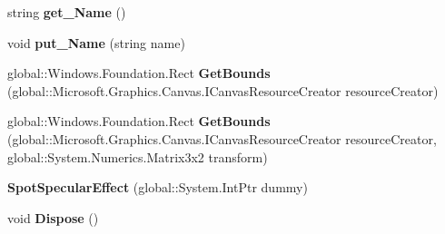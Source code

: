 \begin{DoxyCompactItemize}
\item 
\mbox{\label{class_microsoft_1_1_graphics_1_1_canvas_1_1_effects_1_1_spot_specular_effect_a4cee2d3b8d6c8d7c3806d7c618423b1b}} 
string {\bfseries get\+\_\+\+Name} ()
\item 
\mbox{\label{class_microsoft_1_1_graphics_1_1_canvas_1_1_effects_1_1_spot_specular_effect_acfbb75a4f9d89ea84e89f4b37ae058f6}} 
void {\bfseries put\+\_\+\+Name} (string name)
\item 
\mbox{\label{class_microsoft_1_1_graphics_1_1_canvas_1_1_effects_1_1_spot_specular_effect_af612f6134e91b1ed5295b3aa6fa0540f}} 
global\+::\+Windows.\+Foundation.\+Rect {\bfseries Get\+Bounds} (global\+::\+Microsoft.\+Graphics.\+Canvas.\+I\+Canvas\+Resource\+Creator resource\+Creator)
\item 
\mbox{\label{class_microsoft_1_1_graphics_1_1_canvas_1_1_effects_1_1_spot_specular_effect_a7c7e4f980041eb6d4241d77645cd359a}} 
global\+::\+Windows.\+Foundation.\+Rect {\bfseries Get\+Bounds} (global\+::\+Microsoft.\+Graphics.\+Canvas.\+I\+Canvas\+Resource\+Creator resource\+Creator, global\+::\+System.\+Numerics.\+Matrix3x2 transform)
\item 
\mbox{\label{class_microsoft_1_1_graphics_1_1_canvas_1_1_effects_1_1_spot_specular_effect_ad8ff784c45c090ff7b56ad390b96a1e8}} 
{\bfseries Spot\+Specular\+Effect} (global\+::\+System.\+Int\+Ptr dummy)
\item 
\mbox{\label{class_microsoft_1_1_graphics_1_1_canvas_1_1_effects_1_1_spot_specular_effect_a5ea83a8e811b1574f47c959ac2efc5d5}} 
void {\bfseries Dispose} ()
\item 
\mbox{\label{class_microsoft_1_1_graphics_1_1_canvas_1_1_effects_1_1_spot_specular_effect_aaedc555070dd57d7e182df16376bb184}} 

\end{DoxyCompactItemize}
